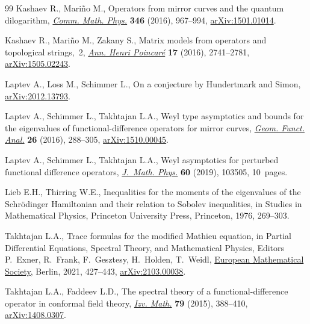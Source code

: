 \documentclass[pdftex]{sigma}%
\numberwithin{equation}{section}
\begin{document}
\begin{thebibliography}{99}
Kashaev R., Mari\~no M., Operators from mirror curves and the quantum
 dilogarithm, \href{https://doi.org/10.1007/s00220-015-2499-1}{\textit{Comm. Math. Phys.}} \textbf{346} (2016), 967--994,
 \href{https://arxiv.org/abs/1501.01014}{arXiv:1501.01014}.

Kashaev R., Mari\~no M., Zakany S., Matrix models from operators and
 topological strings,~2, \href{https://doi.org/10.1007/s00023-016-0471-z}{\textit{Ann. Henri Poincar\'e}} \textbf{17} (2016),
 2741--2781, \href{https://arxiv.org/abs/1505.02243}{arXiv:1505.02243}.

Laptev A., Loss M., Schimmer L., On a conjecture by {H}undertmark and {S}imon,
 \href{https://arxiv.org/abs/2012.13793}{arXiv:2012.13793}.

Laptev A., Schimmer L., Takhtajan L.A., Weyl type asymptotics and bounds for
 the eigenvalues of func\-tional-difference operators for mirror curves,
 \href{https://doi.org/10.1007/s00039-016-0357-8}{\textit{Geom. Funct. Anal.}} \textbf{26} (2016), 288--305,
 \href{https://arxiv.org/abs/1510.00045}{arXiv:1510.00045}.

Laptev A., Schimmer L., Takhtajan L.A., Weyl asymptotics for perturbed
 functional difference operators, \href{https://doi.org/10.1063/1.5093401}{\textit{J.~Math. Phys.}} \textbf{60} (2019),
 103505, 10~pages.

Lieb E.H., Thirring W.E., Inequalities for the moments of the eigenvalues of
 the {S}chr\"odinger {H}amiltonian and their relation to {S}obolev
 inequalities, in Studies in Mathematical Physics, Princeton University Press,
 Princeton, 1976, 269--303.

Takhtajan L.A., Trace formulas for the modified {M}athieu equation, in Partial
 Differential Equations, Spectral Theory, and Mathematical Physics, Editors
 P.~Exner, R.~Frank, F.~Gesztesy, H.~Holden, T.~Weidl, \href{https://doi.org/10.4171/ECR/18-1/25}{European Mathematical
 Society}, Berlin, 2021, 427--443, \href{https://arxiv.org/abs/2103.00038}{arXiv:2103.00038}.

Takhtajan L.A., Faddeev L.D., The spectral theory of a functional-difference
 operator in conformal field theory, \href{https://doi.org/10.1070/IM2015v079n02ABEH002747}{\textit{Izv. Math.}} \textbf{79} (2015),
 388--410, \href{https://arxiv.org/abs/1408.0307}{arXiv:1408.0307}.

\end{thebibliography}\LastPageEnding
\end{document}
